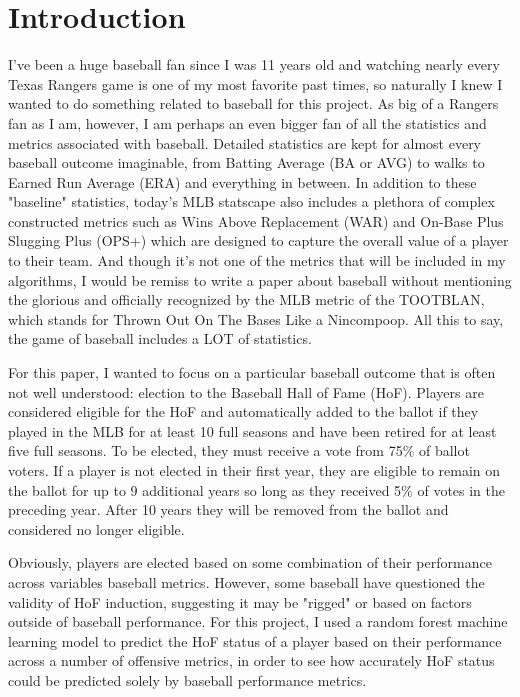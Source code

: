 \documentclass[12pt,english]{article}
\begin{document}
\section{Introduction}\label{sec:intro}
I've been a huge baseball fan since I was 11 years old and watching nearly every Texas Rangers game is one of my most favorite past times, so naturally I knew I wanted to do something related to baseball for this project. As big of a Rangers fan as I am, however, I am perhaps an even bigger fan of all the statistics and metrics associated with baseball. Detailed statistics are kept for almost every baseball outcome imaginable, from Batting Average (BA or AVG) to walks to Earned Run Average (ERA) and everything in between. In addition to these "baseline" statistics, today's MLB statscape also includes a plethora of complex constructed metrics such as Wins Above Replacement (WAR) and On-Base Plus Slugging Plus (OPS+) which are designed to capture the overall value of a player to their team. And though it's not one of the metrics that will be included in my algorithms, I would be remiss to write a paper about baseball without mentioning the glorious and officially recognized by the MLB metric of the TOOTBLAN, which stands for Thrown Out On The Bases Like a Nincompoop. All this to say, the game of baseball includes a LOT of statistics.

For this paper, I wanted to focus on a particular baseball outcome that is often not well understood: election to the Baseball Hall of Fame (HoF). Players are considered eligible for the HoF and automatically added to the ballot if they played in the MLB for at least 10 full seasons and have been retired for at least five full seasons. To be elected, they must receive a vote from 75\% of ballot voters. If a player is not elected in their first year, they are eligible to remain on the ballot for up to 9 additional years so long as they received 5\% of votes in the preceding year. After 10 years they will be removed from the ballot and considered no longer eligible. 

Obviously, players are elected based on some combination of their performance across variables baseball metrics. However, some baseball have questioned the validity of HoF induction, suggesting it may be "rigged" or based on factors outside of baseball performance. For this project, I used a random forest machine learning model to predict the HoF status of a player based on their performance across a number of offensive metrics, in order to see how accurately HoF status could be predicted solely by baseball performance metrics.
\end{document}
